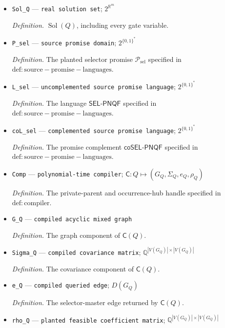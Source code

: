 \documentclass{article}
\begin{document}
\begin{itemize}
  \par\smallskip\noindent\emph{Definition.} The selector coordinate encoded in \(Q\).
  \item \texttt{Sol\_\allowbreak{}Q} --- \texttt{real solution set}; \(2^{\mathbb R^m}\)
  \par\smallskip\noindent\emph{Definition.} \(\operatorname{Sol}(Q)\), including every gate variable.
  \item \texttt{P\_\allowbreak{}sel} --- \texttt{source promise domain}; \(2^{\{0,1\}^{*}}\)
  \par\smallskip\noindent\emph{Definition.} The planted selector promise \(\mathcal P_{\mathrm{sel}}\) specified in \(\mathrm{def:source-promise-languages}\).
  \item \texttt{L\_\allowbreak{}sel} --- \texttt{uncomplemented source promise language}; \(2^{\{0,1\}^{*}}\)
  \par\smallskip\noindent\emph{Definition.} The language \(\mathsf{SEL\mbox{-}PNQF}\) specified in \(\mathrm{def:source-promise-languages}\).
  \item \texttt{coL\_\allowbreak{}sel} --- \texttt{complemented source promise language}; \(2^{\{0,1\}^{*}}\)
  \par\smallskip\noindent\emph{Definition.} The promise complement \(\mathsf{coSEL\mbox{-}PNQF}\) specified in \(\mathrm{def:source-promise-languages}\).
  \item \texttt{Comp} --- \texttt{polynomial-\allowbreak{}time compiler}; \(\mathsf C:Q\mapsto(G_Q,\Sigma_Q,e_Q,\rho_Q)\)
  \par\smallskip\noindent\emph{Definition.} The private-parent and occurrence-hub handle specified in \(\mathrm{def:compiler}\).
  \item \texttt{G\_\allowbreak{}Q} --- \texttt{compiled acyclic mixed graph}
  \par\smallskip\noindent\emph{Definition.} The graph component of \(\mathsf C(Q)\).
  \item \texttt{Sigma\_\allowbreak{}Q} --- \texttt{compiled covariance matrix}; \(\mathbb Q^{|V(G_Q)|\times|V(G_Q)|}\)
  \par\smallskip\noindent\emph{Definition.} The covariance component of \(\mathsf C(Q)\).
  \item \texttt{e\_\allowbreak{}Q} --- \texttt{compiled queried edge}; \(D(G_Q)\)
  \par\smallskip\noindent\emph{Definition.} The selector-master edge returned by \(\mathsf C(Q)\).
  \item \texttt{rho\_\allowbreak{}Q} --- \texttt{planted feasible coefficient matrix}; \(\mathbb Q^{|V(G_Q)|\times|V(G_Q)|}\)

\end{itemize}
\end{document}
